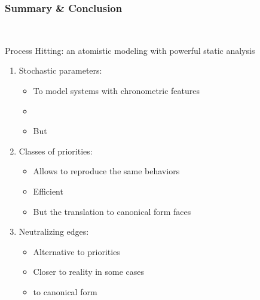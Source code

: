 
\begin{frame}[c]
  \frametitle{Summary \& Conclusion}




~

\vfill

Process Hitting: an atomistic modeling with powerful static analysis

\medskip
\begin{enumerate}[1.]
  \item Stochastic parameters:
    \begin{itemize}
      \item To model systems with chronometric features
      \item {}
      \item But 
    \end{itemize}
  \item Classes of priorities:
    \begin{itemize}
      \item Allows to reproduce the same behaviors
      \item Efficient 
      \item But the translation to canonical form faces 
    \end{itemize}
  \item Neutralizing edges:
    \begin{itemize}
      \item Alternative to priorities
      \item Closer to reality in some cases
      \item {} to canonical form
    \end{itemize}
\end{enumerate}

\vfill
\Large
\begin{flushright}
  \hspace{1cm}~
\end{flushright}
\vfill

~

\end{frame}
